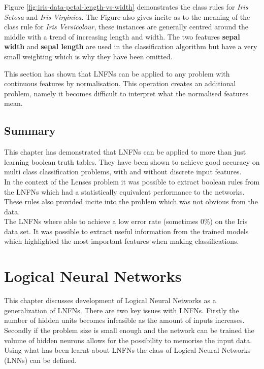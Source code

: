 Figure \ref{fig:iris-data-petal-length-vs-width} demonstrates the class rules for \textit{Iris Setosa} and \textit{Iris Virginica}. The Figure also gives incite as to the meaning of the class rule for \textit{Iris Versicolour}, these instances are generally centred around the middle with a trend of increasing length and width. The two features \textbf{sepal width} and \textbf{sepal length} are used in the classification algorithm but have a very small weighting which is why they have been omitted.

This section has shown that LNFNs can be applied to any problem with continuous features by normalisation. This operation creates an additional problem, namely it becomes difficult to interpret what the normalised features mean.

\section{Summary}
This chapter has demonstrated that LNFNs can be applied to more than just learning boolean truth tables. They have been shown to achieve good accuracy on multi class classification problems, with and without discrete input features.\\

In the context of the Lenses problem it was possible to extract boolean rules from the LNFNs which had a statistically equivalent performance to the networks. These rules also provided incite into the problem which was not obvious from the data.\\

The LNFNs where able to achieve a low error rate (sometimes 0\%) on the Iris data set. It was possible to extract useful information from the trained models which highlighted the most important features when making classifications.

\chapter{Logical Neural Networks} \label{C:lnn}
This chapter discusses development of Logical Neural Networks as a generalization of LNFNs. There are two key issues with LNFNs. Firstly the number of hidden units becomes infeasible as the amount of inputs increases. Secondly if the problem size is small enough and the network can be trained the volume of hidden neurons allows for the possibility to memorise the input data. Using what has been learnt about LNFNs the class of Logical Neural Networks (LNNs) can be defined.

